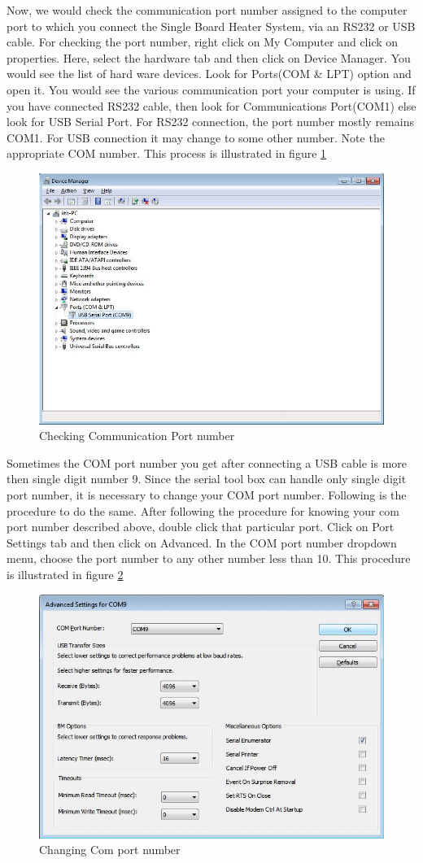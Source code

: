 \documentclass[12pt]{report}
\begin{document}
Now, we would check the communication port number assigned to the computer port to which you connect the Single Board Heater System, via an RS232 or USB cable.  For checking the port number, right click on My Computer and click on properties. Here, select the hardware tab and then click on Device Manager. You would see the list of hard ware devices. Look for Ports(COM \& LPT) option and open it. You would see the various communication port your computer is using. If you have connected RS232 cable, then look for Communications Port(COM1) else look for USB Serial Port. For RS232 connection, the port number mostly remains COM1. For USB connection it may change to some other number. Note the appropriate COM number. This process is illustrated in figure \ref{com_number}
\begin{figure}
\centering
\includegraphics[width=0.7\linewidth]{COM.jpg}
\caption{Checking Communication Port number}
\label{com_number}
\end{figure}

Sometimes the COM port number you get after connecting a USB cable is more then single digit number 9. Since the serial tool box can handle only single digit port number, it is necessary to change your COM port number. Following is the procedure to do the same.
After following the procedure for knowing your com port number described above, double click that particular port. Click on Port Settings tab and then click on Advanced. In the COM port number dropdown menu, choose the port number to any other number less than 10. This procedure is illustrated in figure \ref{com_change}
\begin{figure}
\centering
\includegraphics[width=0.7\linewidth]{port2.jpg}
\caption{Changing Com port number}
\label{com_change}
\end{figure}
\end{document}
